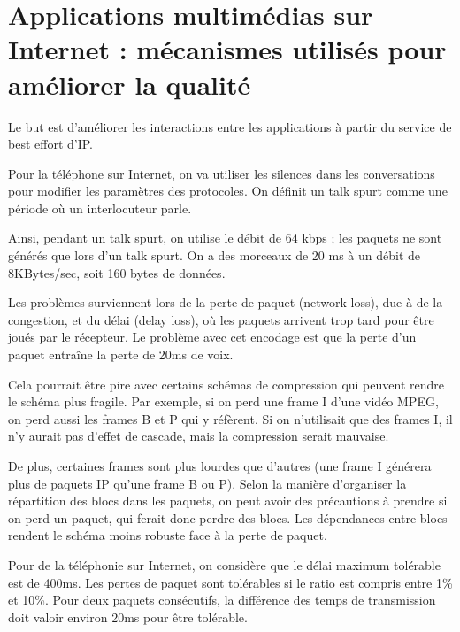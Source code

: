 \chapter{Applications multimédias sur Internet : mécanismes utilisés pour améliorer la qualité}

	Le but est d'améliorer les interactions entre les applications à partir du service de best effort d'IP.
	
	Pour la téléphone sur Internet, on va utiliser les silences dans les conversations pour modifier les paramètres des protocoles. On définit un talk spurt comme une période où un interlocuteur parle.
	
	Ainsi, pendant un talk spurt, on utilise le débit de 64 kbps ; les paquets ne sont générés que lors d'un talk spurt. On a des morceaux de 20 ms à un débit de 8KBytes/sec, soit 160 bytes de données.
	
	Les problèmes surviennent lors de la perte de paquet (network loss), due à de la congestion, et du délai (delay loss), où les paquets arrivent trop tard pour être joués par le récepteur. Le problème avec cet encodage est que la perte d'un paquet entraîne la perte de 20ms de voix. 
	
	Cela pourrait être pire avec certains schémas de compression qui peuvent rendre le schéma plus fragile. Par exemple, si on perd une frame I d'une vidéo MPEG, on perd aussi les frames B et P qui y réfèrent. Si on n'utilisait que des frames I, il n'y aurait pas d'effet de cascade, mais la compression serait mauvaise. 
	
	De plus, certaines frames sont plus lourdes que d'autres (une frame I générera plus de paquets IP qu'une frame B ou P). Selon la manière d'organiser la répartition des blocs dans les paquets, on peut avoir des précautions à prendre si on perd un paquet, qui ferait donc perdre des blocs. Les dépendances entre blocs rendent le schéma moins robuste face à la perte de paquet.
	
	Pour de la téléphonie sur Internet, on considère que le délai maximum tolérable est de 400ms. Les pertes de paquet sont tolérables si le ratio est compris entre 1\% et 10\%. Pour deux paquets consécutifs, la différence des temps de transmission doit valoir environ 20ms pour être tolérable.
	
		
	
